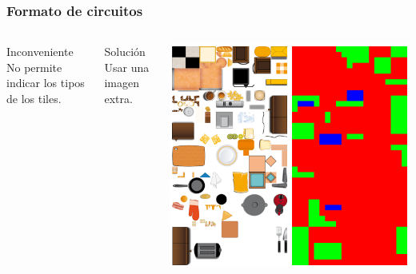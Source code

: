 \begin{frame}
    \frametitle{Formato de circuitos}

    \begin{columns}

        \column{150px}

        \begin{block}{Inconveniente}
            No permite indicar los tipos de los tiles.
        \end{block}
    
        \begin{block}{Solución}
        Usar una imagen extra.
        \end{block}

        \column{180px}
        \begin{center}
                \includegraphics[scale=0.18]{imagenes/tileset-collisionmap.png}
        \end{center}
        
    \end{columns}

\end{frame}

